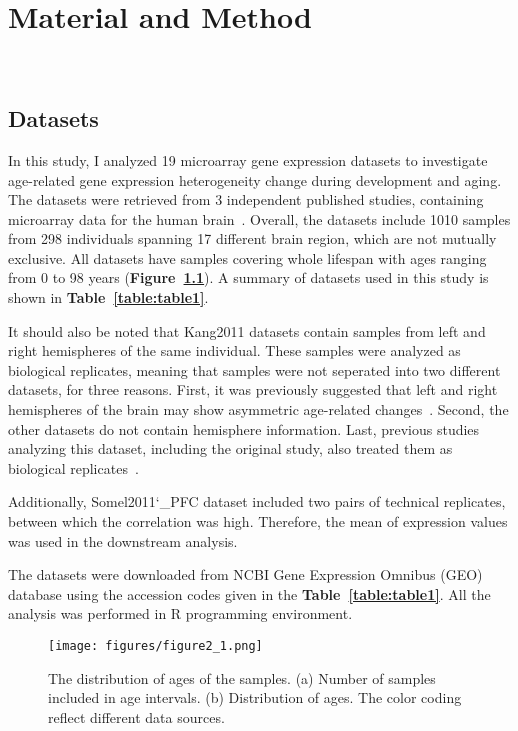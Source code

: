\chapter{Material and Method}~\label{chp:b2}
\section{Datasets}
In this study, I analyzed 19 microarray gene expression datasets to investigate age-related gene expression heterogeneity change during development and aging.
The datasets were retrieved from 3 independent published studies, containing microarray data for the human brain~\cite{Colantuoni2011, Kang2011, Somel2011, Somel2010}.
Overall, the datasets include 1010 samples from 298 individuals spanning 17 different brain region, which are not mutually exclusive.
All datasets have samples covering whole lifespan with ages ranging from 0 to 98 years (\textbf{Figure~\ref{fig:fig2.1}}).
A summary of datasets used in this study is shown in \textbf{Table~\ref{table:table1}}.

It should also be noted that Kang2011 datasets contain samples from left and right hemispheres of the same individual.
These samples were analyzed as biological replicates, meaning that samples were not seperated into two different datasets, for three reasons.
First, it was previously suggested that left and right hemispheres of the brain may show asymmetric age-related changes~\cite{Sun2005, Dolcos2002}.
Second, the other datasets do not contain hemisphere information.
Last, previous studies analyzing this dataset, including the original study, also treated them as biological replicates~\cite{Kang2011,Donertas2017}.

Additionally, Somel2011\char`_PFC dataset included two pairs of technical replicates, between which the correlation was high. 
Therefore, the mean of expression values was used in the downstream analysis.


The datasets were downloaded from NCBI Gene Expression Omnibus (GEO) database using the accession codes given in the
\textbf{Table~\ref{table:table1}}. 
All the analysis was performed in R programming environment.

\begin{figure}[h]
\centering
\texttt{[image: figures/figure2\_1.png]}
\caption{The distribution of ages of the samples. (a) Number of samples included in age intervals. (b) Distribution of ages. The color coding reflect different data sources. }\label{fig:fig2.1}
\end{figure}

